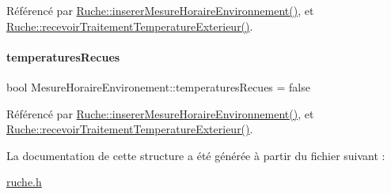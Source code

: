Référencé par \hyperlink{class_ruche_ac52e79446c5629645e02e27d2a01e56c}{Ruche\+::inserer\+Mesure\+Horaire\+Environnement()}, et \hyperlink{class_ruche_a8482dda95a8a7888d5a60ea6f7d8729e}{Ruche\+::recevoir\+Traitement\+Temperature\+Exterieur()}.

\mbox{\label{struct_mesure_horaire_environement_a3444440b836c4893e8d61c3eb5c3e42d}} 
\paragraph{\texorpdfstring{temperatures\+Recues}{temperaturesRecues}}
{\footnotesize\ttfamily bool Mesure\+Horaire\+Environement\+::temperatures\+Recues = false}



Référencé par \hyperlink{class_ruche_ac52e79446c5629645e02e27d2a01e56c}{Ruche\+::inserer\+Mesure\+Horaire\+Environnement()}, et \hyperlink{class_ruche_a8482dda95a8a7888d5a60ea6f7d8729e}{Ruche\+::recevoir\+Traitement\+Temperature\+Exterieur()}.



La documentation de cette structure a été générée à partir du fichier suivant \+:\begin{DoxyCompactItemize}
\item 
\hyperlink{ruche_8h}{ruche.\+h}\end{DoxyCompactItemize}
